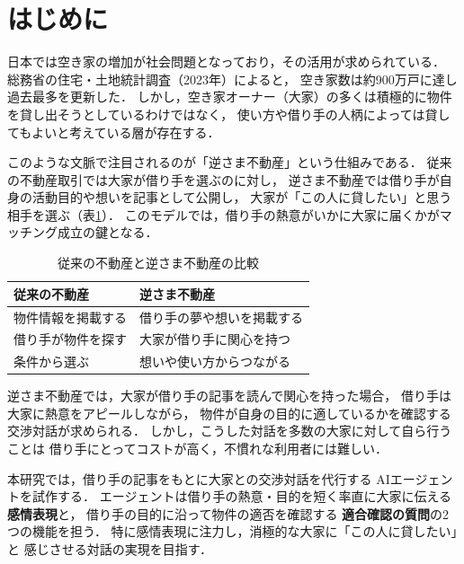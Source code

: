 \documentclass{FITpaper}
\begin{document}
\maketitle

\section{はじめに}

日本では空き家の増加が社会問題となっており，その活用が求められている．
総務省の住宅・土地統計調査（2023年）によると，
空き家数は約900万戸に達し過去最多を更新した．
しかし，空き家オーナー（大家）の多くは積極的に物件を貸し出そうとしているわけではなく，
使い方や借り手の人柄によっては貸してもよいと考えている層が存在する．

このような文脈で注目されるのが「逆さま不動産」という仕組みである．
従来の不動産取引では大家が借り手を選ぶのに対し，
逆さま不動産では借り手が自身の活動目的や想いを記事として公開し，
大家が「この人に貸したい」と思う相手を選ぶ（表\ref{tbl:sakasama}）．
このモデルでは，借り手の熱意がいかに大家に届くかがマッチング成立の鍵となる．

\begin{table}[htbp]
  \centering
  \caption{従来の不動産と逆さま不動産の比較}
  \label{tbl:sakasama}
  \begin{tabular}{l|l}
    従来の不動産 & 逆さま不動産 \\
    \hline
    物件情報を掲載する & 借り手の夢や想いを掲載する \\
    借り手が物件を探す & 大家が借り手に関心を持つ \\
    条件から選ぶ & 想いや使い方からつながる \\
  \end{tabular}
\end{table}

逆さま不動産では，大家が借り手の記事を読んで関心を持った場合，
借り手は大家に熱意をアピールしながら，
物件が自身の目的に適しているかを確認する交渉対話が求められる．
しかし，こうした対話を多数の大家に対して自ら行うことは
借り手にとってコストが高く，不慣れな利用者には難しい．

本研究では，借り手の記事をもとに大家との交渉対話を代行する
AIエージェントを試作する．
エージェントは借り手の熱意・目的を短く率直に大家に伝える
\textbf{感情表現}と，
借り手の目的に沿って物件の適否を確認する
\textbf{適合確認の質問}の2つの機能を担う．
特に感情表現に注力し，消極的な大家に「この人に貸したい」と
感じさせる対話の実現を目指す．
\end{document}
